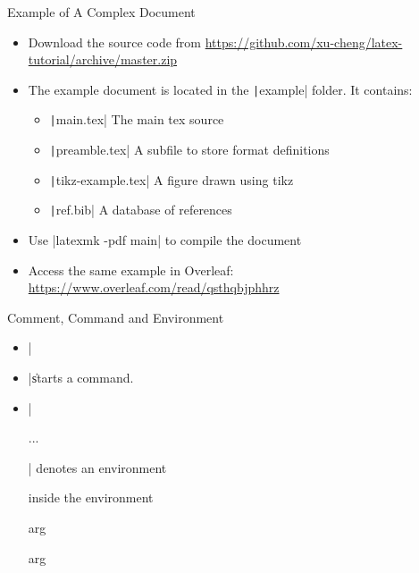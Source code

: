 \begin{frame}[fragile]{Example of A Complex Document}
  \begin{itemize}
    \item Download the source code from \url{https://github.com/xu-cheng/latex-tutorial/archive/master.zip}
    \item The example document is located in the \texttt|example| folder. It contains:
          \begin{itemize}
            \item \texttt|main.tex| The main tex source
            \item \texttt|preamble.tex| A subfile to store format definitions
            \item \texttt|tikz-example.tex| A figure drawn using tikz
            \item \texttt|ref.bib| A database of references
          \end{itemize}
    \item Use \bashinline|latexmk -pdf main| to compile the document
    \item Access the same example in Overleaf: \url{https://www.overleaf.com/read/qsthqbjphhrz}
  \end{itemize}
\end{frame}

\begin{frame}[fragile]{Comment, Command and Environment}
  \begin{itemize}
    \item \latexinline|%
    \item \latexinline|\| starts a command.
          \begin{latexcode}
            \command %
            \command{} %
          \end{latexcode}
    \item \latexinline|\begin{} ... \end{}| denotes an environment
          \begin{latexcode}
            \begin{envname}
              inside the environment
            \end{envname}
            \begin{envname}{arg} \end{envname}
            \begin{envname}{arg} \end{envname}
          \end{latexcode}
  \end{itemize}
\end{frame}

